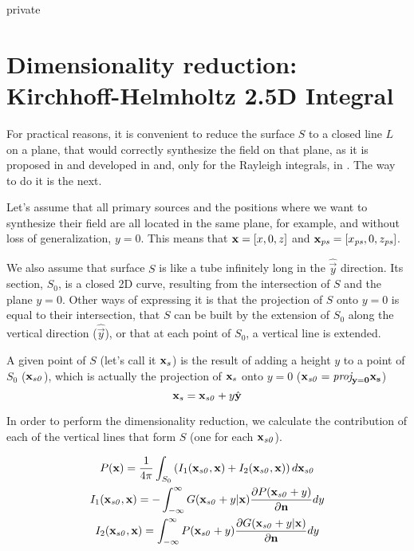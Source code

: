 \begin{shownto}{private}
\section{Dimensionality reduction: Kirchhoff-Helmholtz 2.5D Integral}
For practical reasons, it is convenient to reduce the surface $S$ to a closed line $L$ on a plane, that would correctly synthesize the field on that plane, as it is proposed in \cite{Vogel} and developed in \cite{Start1997} and, only for the Rayleigh integrals, in \cite{Verheijen}. The way to do it is the next.

Let's assume that all primary sources and the positions where we want to synthesize their field are all located in the same plane, for example, and without loss of generalization, $y = 0$. This means that $\PosTheo = [x, 0, z]$ and $\PosTheo[primarySource] = [x_\mathit{ps}, 0, z_\mathit{ps}]$.

We also assume that surface $S$ is like a tube infinitely long in the $\hat{\vec{y}}$ direction. Its section, $S_0$, is a closed 2D curve, resulting from the intersection of $S$ and the plane $y=0$. Other ways of expressing it is that the projection of $S$ onto $y=0$ is equal to their intersection, that $S$ can be built by the extension of $S_0$ along the vertical direction ($\hat{\vec{y}}$), or that at each point of $S_0$, a vertical line is extended.

A given point of $S$ (let's call it $\PosTheo[surface]$) is the result of adding a height $y$ to a point of $S_0$ ($\PosTheo[section]$), which is actually the projection of $\PosTheo[surface]$ onto $y=0$ ($\PosTheo[section] = \vectorproj[y=0]{\PosTheo[surface]}$)
\begin{equation}
\PosTheo[surface] = \PosTheo[section] + y\hat{\vec{y}}
\end{equation}

In order to perform the dimensionality reduction, we calculate the contribution of each of the vertical lines that form $S$ (one for each $\PosTheo[section]$).

\begin{gather}
	P(\PosTheo) = \frac{1}{4\pi} \int_{S_0} \left( I_{1}(\PosTheo[section], \PosTheo) + I_2(\PosTheo[section], \PosTheo) \right)
	d\PosTheo[section] \\
	I_{1}(\PosTheo[section], \PosTheo) = - \int_{-\infty}^{\infty} G(\PosTheo[section] + y \vert \PosTheo) \frac{\partial P(\PosTheo[section] + y)}{\partial \mathbf{n}} dy \label{lineIntI} \\	I_{2}(\PosTheo[section], \PosTheo) = \int_{-\infty}^{\infty} P(\PosTheo[section] + y)\frac{\partial G(\PosTheo[section] + y\vert \PosTheo)}{\partial \mathbf{n}} dy \label{lineIntII}
\end{gather}


\end{shownto}
